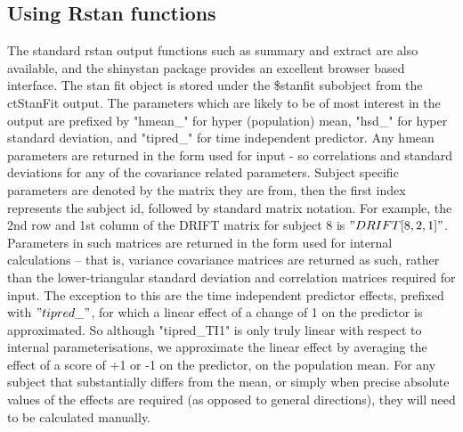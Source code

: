 \documentclass[nojss]{jss}\usepackage[]{graphicx}\usepackage[]{color}
\begin{document}
\subsection{Using Rstan functions}
The standard rstan output functions such as summary and extract are also available, and the shinystan package provides an excellent browser based interface. The stan fit object is stored under the \$stanfit subobject from the ctStanFit output. The parameters which are likely to be of most interest in the output are prefixed by "hmean\_" for hyper (population) mean, "hsd\_" for hyper standard deviation, and "tipred\_" for time independent predictor. Any hmean parameters are returned in the form used for input - so correlations and standard deviations for any of the covariance related parameters. Subject specific parameters are denoted by the matrix they are from, then the first index represents the subject id, followed by standard matrix notation. For example, the 2nd row and 1st column of the DRIFT matrix for subject 8 is $"DRIFT[8,2,1]"$. Parameters in such matrices are returned in the form used for internal calculations -- that is, variance covariance matrices are returned as such, rather than the lower-triangular standard deviation and correlation matrices required for input. The exception to this are the time independent predictor effects, prefixed with $"tipred\_"$, for which a linear effect of a change of 1 on the predictor is approximated. So although "tipred\_TI1" is only truly linear with respect to internal parameterisations, we approximate the linear effect by averaging the effect of a score of +1 or -1 on the predictor, on the population mean. For any subject that substantially differs from the mean, or simply when precise absolute values of the effects are required (as opposed to general directions), they will need to be calculated manually.
\end{document}

